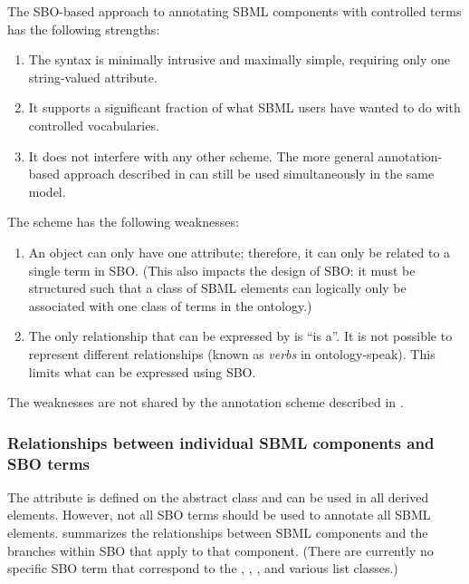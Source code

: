 The SBO-based approach to annotating SBML components with
controlled terms has the following strengths:
\begin{enumerate}

\item The syntax is minimally intrusive and maximally simple,
  requiring only one string-valued attribute.

\item It supports a significant fraction of what SBML users have wanted
  to do with controlled vocabularies.

\item It does not interfere with any other scheme.  The more
  general annotation-based approach described in
   can still be used
  simultaneously in the same model.

\end{enumerate}

The scheme has the following weaknesses:
\begin{enumerate}

\item An object can only have one  attribute;
  therefore, it can only be related to a single term in SBO.
  (This also impacts the design of SBO: it must be structured such
  that a class of SBML elements can logically only be associated
  with one class of terms in the ontology.)

\item The only relationship that can be expressed by
   is ``is a''.  It is not possible to represent
  different relationships (known as \emph{verbs} in
  ontology-speak).  This limits what can be expressed using SBO.

\end{enumerate}



The weaknesses are not shared by the annotation scheme described
in .  


\subsubsection{Relationships between individual SBML components and SBO terms}

The  attribute is defined on the abstract class
\SBase and can be used in all derived elements.  However, not all
SBO terms should be used to annotate all SBML elements.
 summarizes the relationships
between SBML components and the branches within SBO that apply to
that component. (There are currently no specific SBO term that
correspond to the \SBML, \UnitDefinition, \Unit, and various
 list classes.)

